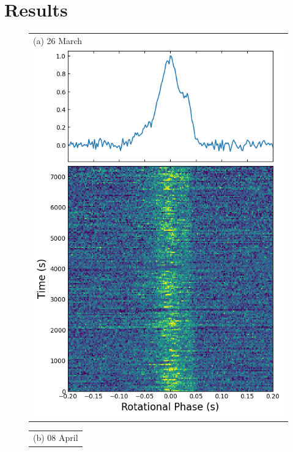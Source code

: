 \documentclass[twocolumn]{emulateapj}
\begin{document}
\section{Results}
\label{sec:results}
%
\begin{figure}[b]
    \begin{tabular}[b]{@{}p{}@{}}
    \centering\small (a) 26 March
	\includegraphics[width=\linewidth]{plots/s-band_Mar26.png}
    \end{tabular}
    \begin{tabular}[b]{@{}p{}@{}}
    \centering\small (b) 08 April

\end{tabular}
\end{figure}
\end{document}
